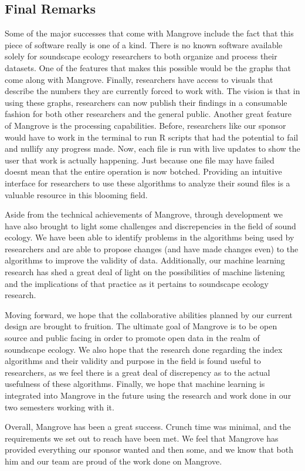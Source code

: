 \subsection{Final Remarks}
Some of the major successes that come with Mangrove include the fact that this piece of software really is one of a kind. There is no known software available solely for soundscape ecology researchers to both organize and process their datasets. One of the features that makes this possible would be the graphs that come along with Mangrove. Finally, researchers have access to visuals that describe the numbers they are currently forced to work with. The vision is that in using these graphs, researchers can now publish their findings in a consumable fashion for both other researchers and the general public. Another great feature of Mangrove is the processing capabilities. Before, researchers like our sponsor would have to work in the terminal to run R scripts that had the potential to fail and nullify any progress made. Now, each file is run with live updates to show the user that work is actually happening. Just because one file may have failed doesn\textquotesingle t mean that the entire operation is now botched. Providing an intuitive interface for researchers to use these algorithms to analyze their sound files is a valuable resource in this blooming field.\par
Aside from the technical achievements of Mangrove, through development we have also brought to light some challenges and discrepencies in the field of sound ecology. We have been able to identify problems in the algorithms being used by researchers and are able to propose changes (and have made changes even) to the algorithms to improve the validity of data. Additionally, our machine learning research has shed a great deal of light on the possibilities of machine listening and the implications of that practice as it pertains to soundscape ecology research.\par
Moving forward, we hope that the collaborative abilities planned by our current design are brought to fruition. The ultimate goal of Mangrove is to be open source and public facing in order to promote open data in the realm of soundscape ecology. We also hope that the research done regarding the index algorithms and their validity and purpose in the field is found useful to researchers, as we feel there is a great deal of discrepency as to the actual usefulness of these algorithms. Finally, we hope that machine learning is integrated into Mangrove in the future using the research and work done in our two semesters working with it.\par
Overall, Mangrove has been a great success. Crunch time was minimal, and the requirements we set out to reach have been met. We feel that Mangrove has provided everything our sponsor wanted and then some, and we know that both him and our team are proud of the work done on Mangrove.\par
